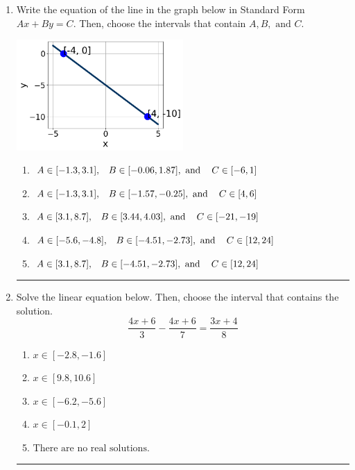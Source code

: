 \documentclass[14pt]{extbook}
\newcommand{\litem}[1]{\item#1\hspace*{-1cm}\rule{\textwidth}{0.4pt}}
\begin{document}
\begin{enumerate}
{\begin{enumerate}[label=\Alph*.]
\end{enumerate} }
\litem{
Write the equation of the line in the graph below in Standard Form $Ax+By=C$. Then, choose the intervals that contain $A, B, \text{ and } C$.
\begin{center}
    \includegraphics[width=0.5\textwidth]{../Figures/linearGraphToStandardCopyA.png}
\end{center}
\begin{enumerate}[label=\Alph*.]
\item \( A \in [-1.3, 3.1], \hspace{3mm} B \in [-0.06, 1.87], \text{ and } \hspace{3mm} C \in [-6, 1] \)
\item \( A \in [-1.3, 3.1], \hspace{3mm} B \in [-1.57, -0.25], \text{ and } \hspace{3mm} C \in [4, 6] \)
\item \( A \in [3.1, 8.7], \hspace{3mm} B \in [3.44, 4.03], \text{ and } \hspace{3mm} C \in [-21, -19] \)
\item \( A \in [-5.6, -4.8], \hspace{3mm} B \in [-4.51, -2.73], \text{ and } \hspace{3mm} C \in [12, 24] \)
\item \( A \in [3.1, 8.7], \hspace{3mm} B \in [-4.51, -2.73], \text{ and } \hspace{3mm} C \in [12, 24] \)

\end{enumerate} }
\litem{
Solve the linear equation below. Then, choose the interval that contains the solution.\[ \frac{4x + 6}{3} - \frac{4x + 6}{7} = \frac{3x + 4}{8} \]\begin{enumerate}[label=\Alph*.]
\item \( x \in [-2.8, -1.6] \)
\item \( x \in [9.8, 10.6] \)
\item \( x \in [-6.2, -5.6] \)
\item \( x \in [-0.1, 2] \)
\item \( \text{There are no real solutions.} \)

\end{enumerate} }
\end{enumerate}
\end{document}
